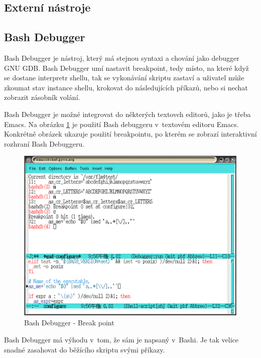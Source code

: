 \documentclass[thesis=M,czech]{FITthesis}[2012/06/26]
\begin{document}


\subsection{Externí nástroje}



\subsection{Bash Debugger}

Bash Debugger \cite{bashdb} je nástroj, který má stejnou syntaxi a chování jako debugger GNU GDB. Bash Debugger umí nastavit breakpoint, tedy místo, na které když se dostane interpretr shellu, tak se vykonávání skriptu zastaví a uživatel může zkoumat stav instance shellu, krokovat do následujících příkazů, nebo si nechat zobrazit zásobník volání.

Bash Debugger je možné integrovat do některých textovch editorů, jako je třeba Emacs. Na obrázku \ref{fig:bashdb} je použití Bash debuggeru v~textovém editoru Emacs. Konkrétně obrázek ukazuje použití breakpointu, po kterém se zobrazí interaktivní rozhraní Bash Debuggeru.


\begin{figure}[htb]\centering
	\includegraphics[width=\textwidth]{./images/bashdb-break_invert}
	\caption{Bash Debugger - Break point}
	\label{fig:bashdb}
\end{figure}

Bash Debugger má výhodu v~tom, že sám je napsaný v~Bashi. Je tak velice snadné zasahovat do běžícího skriptu svými příkazy.
\end{document}
